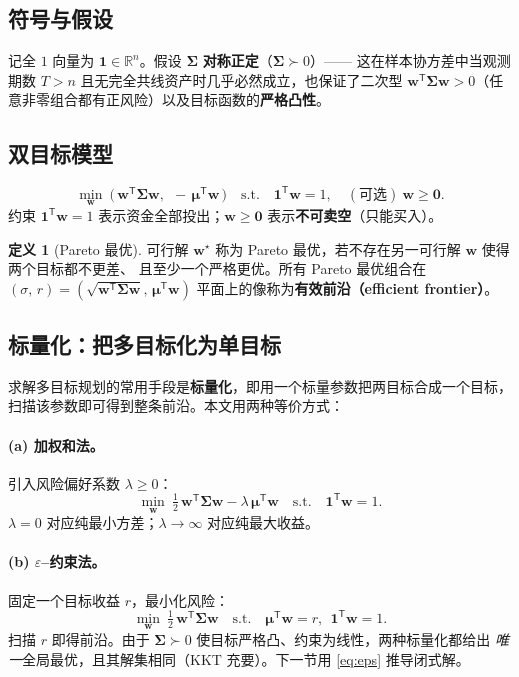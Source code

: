 \documentclass[12pt]{ctexart}
\newcommand{\R}{\mathbb{R}}
\newcommand{\w}{\bm{w}}
\newcommand{\muv}{\bm{\mu}}
\newcommand{\Sig}{\bm{\Sigma}}
\newcommand{\one}{\mathbf{1}}
\newcommand{\T}{^{\mathsf{T}}}
\theoremstyle{definition}
\newtheorem{definition}{定义}
\theoremstyle{plain}
\begin{document}
\subsection{符号与假设}
记全 $1$ 向量为 $\one\in\R^n$。假设 $\Sig$ \textbf{对称正定}（$\Sig\succ 0$）——
这在样本协方差中当观测期数 $T>n$ 且无完全共线资产时几乎必然成立，也保证了二次型
$\w\T\Sig\w>0$（任意非零组合都有正风险）以及目标函数的\textbf{严格凸性}。

\subsection{双目标模型}
\begin{equation}
\min_{\w}\ \Big(\, \w\T\Sig\w,\ \ -\,\muv\T\w \,\Big)
\quad\text{s.t.}\quad \one\T\w=1,\quad (\text{可选})\ \w\ge\bm 0 .
\label{eq:biobj}
\end{equation}
约束 $\one\T\w=1$ 表示资金全部投出；$\w\ge\bm 0$ 表示\textbf{不可卖空}（只能买入）。

\begin{definition}[Pareto 最优]
可行解 $\w^\star$ 称为 Pareto 最优，若不存在另一可行解 $\w$ 使得两个目标都不更差、
且至少一个严格更优。所有 Pareto 最优组合在 $(\sigma,\,r)=(\sqrt{\w\T\Sig\w},\,\muv\T\w)$
平面上的像称为\textbf{有效前沿（efficient frontier）}。
\end{definition}

\subsection{标量化：把多目标化为单目标}
求解多目标规划的常用手段是\textbf{标量化}，即用一个标量参数把两目标合成一个目标，
扫描该参数即可得到整条前沿。本文用两种等价方式：

\paragraph{(a) 加权和法。}引入风险偏好系数 $\lambda\ge0$：
\begin{equation}
\min_{\w}\ \tfrac12\,\w\T\Sig\w-\lambda\,\muv\T\w \quad\text{s.t.}\quad \one\T\w=1 .
\label{eq:weighted}
\end{equation}
$\lambda=0$ 对应纯最小方差；$\lambda\to\infty$ 对应纯最大收益。

\paragraph{(b) $\varepsilon$--约束法。}固定一个目标收益 $r$，最小化风险：
\begin{equation}
\min_{\w}\ \tfrac12\,\w\T\Sig\w \quad\text{s.t.}\quad \muv\T\w=r,\ \ \one\T\w=1 .
\label{eq:eps}
\end{equation}
扫描 $r$ 即得前沿。由于 $\Sig\succ0$ 使目标严格凸、约束为线性，两种标量化都给出
\emph{唯一}全局最优，且其解集相同（KKT 充要）。下一节用 \eqref{eq:eps} 推导闭式解。
\end{document}
